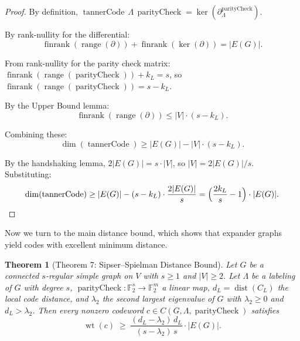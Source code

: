 \documentclass[11pt]{article}
\theoremstyle{plain}
\newtheorem*{theorem}{Theorem}
\theoremstyle{definition}
\theoremstyle{remark}
\renewcommand{\ker}{\operatorname{ker}}
\begin{document}
\begin{proof}
By definition, $\operatorname{tannerCode}\,\Lambda\,\operatorname{parityCheck} = \ker(\partial_\Lambda^{\operatorname{parityCheck}})$.

By rank-nullity for the differential:
\[
\operatorname{finrank}(\operatorname{range}(\partial)) + \operatorname{finrank}(\ker(\partial)) = |E(G)|.
\]

From rank-nullity for the parity check matrix: $\operatorname{finrank}(\operatorname{range}(\operatorname{parityCheck})) + k_L = s$, so $\operatorname{finrank}(\operatorname{range}(\operatorname{parityCheck})) = s - k_L$.

By the Upper Bound lemma:
\[
\operatorname{finrank}(\operatorname{range}(\partial)) \leq |V|\cdot(s - k_L).
\]

Combining these:
\[
\dim(\operatorname{tannerCode}) \geq |E(G)| - |V|\cdot(s - k_L).
\]

By the handshaking lemma, $2|E(G)| = s\cdot|V|$, so $|V| = 2|E(G)|/s$. Substituting:
\[
\dim(\operatorname{tannerCode}) \geq |E(G)| - (s-k_L)\cdot\frac{2|E(G)|}{s} = \Bigl(\frac{2k_L}{s} - 1\Bigr)\cdot|E(G)|.
\]
\end{proof}

Now we turn to the main distance bound, which shows that expander graphs yield codes with excellent minimum distance.

\begin{theorem}[Theorem 7: Sipser--Spielman Distance Bound]
Let $G$ be a connected $s$-regular simple graph on $V$ with $s \geq 1$ and $|V| \geq 2$. Let $\Lambda$ be a labeling of $G$ with degree $s$, $\operatorname{parityCheck} : \mathbb{F}_2^s \to \mathbb{F}_2^m$ a linear map, $d_L = \operatorname{dist}(C_L)$ the local code distance, and $\lambda_2$ the second largest eigenvalue of $G$ with $\lambda_2 \geq 0$ and $d_L > \lambda_2$. Then every nonzero codeword $c \in C(G, \Lambda, \operatorname{parityCheck})$ satisfies
\[
\operatorname{wt}(c) \;\geq\; \frac{(d_L - \lambda_2)\, d_L}{(s - \lambda_2)\, s} \cdot |E(G)|.
\]
\end{theorem}
\end{document}
